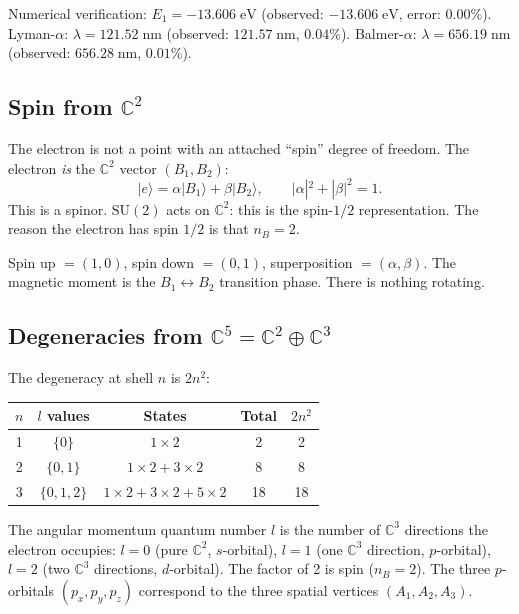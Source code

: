 \documentclass[12pt]{article}
\theoremstyle{remark}
\theoremstyle{definition}
\newcommand{\CC}{\mathbb{C}}
\begin{document}
Numerical verification: $E_1 = -13.606\;\text{eV}$ (observed: $-13.606\;\text{eV}$, error: $0.00\%$). Lyman-$\alpha$: $\lambda = 121.52\;\text{nm}$ (observed: $121.57\;\text{nm}$, $0.04\%$). Balmer-$\alpha$: $\lambda = 656.19\;\text{nm}$ (observed: $656.28\;\text{nm}$, $0.01\%$).

\subsection{Spin from $\CC^2$}

The electron is not a point with an attached ``spin'' degree of freedom. The electron \emph{is} the $\CC^2$ vector $(B_1, B_2)$:
\begin{equation}
|e\rangle = \alpha|B_1\rangle + \beta|B_2\rangle, \qquad |\alpha|^2 + |\beta|^2 = 1.
\end{equation}
This is a spinor. $\text{SU}(2)$ acts on $\CC^2$: this is the spin-$1/2$ representation. The reason the electron has spin $1/2$ is that $n_B = 2$.

Spin up $= (1, 0)$, spin down $= (0, 1)$, superposition $= (\alpha, \beta)$. The magnetic moment is the $B_1 \leftrightarrow B_2$ transition phase. There is nothing rotating.

\subsection{Degeneracies from $\CC^5 = \CC^2 \oplus \CC^3$}

The degeneracy at shell $n$ is $2n^2$:
\begin{center}
\begin{tabular}{ccccc}
\hline
$n$ & $l$ values & States & Total & $2n^2$ \\
\hline
1 & $\{0\}$ & $1 \times 2$ & 2 & 2 \\
2 & $\{0, 1\}$ & $1 \times 2 + 3 \times 2$ & 8 & 8 \\
3 & $\{0, 1, 2\}$ & $1 \times 2 + 3 \times 2 + 5 \times 2$ & 18 & 18 \\
\hline
\end{tabular}
\end{center}

The angular momentum quantum number $l$ is the number of $\CC^3$ directions the electron occupies: $l = 0$ (pure $\CC^2$, $s$-orbital), $l = 1$ (one $\CC^3$ direction, $p$-orbital), $l = 2$ (two $\CC^3$ directions, $d$-orbital). The factor of 2 is spin ($n_B = 2$). The three $p$-orbitals $(p_x, p_y, p_z)$ correspond to the three spatial vertices $(A_1, A_2, A_3)$.
\end{document}
